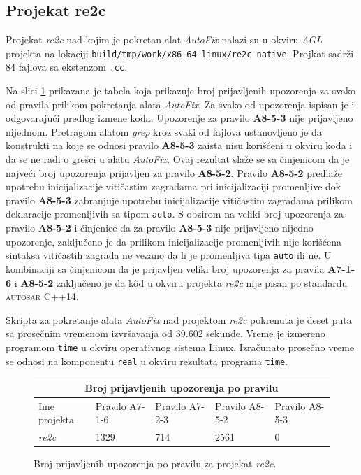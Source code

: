 \documentclass[12pt,oneside]{memoir}
\begin{document}
\subsection{Projekat re2c}

Projekat \textit{re2c} nad kojim je pokretan alat \textit{AutoFix} nalazi su u okviru \textit{AGL} projekta na lokaciji \texttt{build/tmp/work/x86\_64-linux/re2c-native}. Projkat sadr\v{z}i 84 fajlova sa ekstenzom \texttt{.cc}. \par
Na slici \ref{fig:re2c} prikazana je tabela koja prikazuje broj prijavljenih upozorenja za svako od pravila prilikom pokretanja alata \textit{AutoFix}.
Za svako od upozorenja ispisan je i odgovaraju\'{c}i predlog izmene koda. Upozorenje za pravilo \textbf{A8-5-3} nije prijavljeno nijednom. Pretragom
alatom \textit{grep} kroz svaki od fajlova ustanovljeno je da konstrukti na koje se odnosi pravilo \textbf{A8-5-3} zaista nisu kori\v{s}\'{c}eni u okviru koda i da se ne radi o gre\v{s}ci u alatu \textit{AutoFix}. Ovaj rezultat sla\v{z}e se sa \v{c}injenicom da je najve\'{c}i broj upozorenja prijavljen za pravilo \textbf{A8-5-2}. Pravilo \textbf{A8-5-2} predla\v{z}e upotrebu inicijalizacije viti\v{c}astim zagradama pri inicijalizaciji promenljive dok pravilo \textbf{A8-5-3} zabranjuje upotrebu inicijalizacije viti\v{c}astim zagradama prilikom deklaracije promenljivih sa tipom \texttt{auto}. S obzirom na veliki broj upozorenja za pravilo \textbf{A8-5-2} i \v{c}injenice da za pravilo \textbf{A8-5-3} nije prijavljeno nijedno upozorenje, zaklju\v{c}eno je da prilikom inicijalizacije promenljivih nije kori\v{s}\'{c}ena sintaksa viti\v{c}astih zagrada ne vezano da li je promenljiva
tipa \texttt{auto} ili ne. U kombinaciji sa \v{c}injenicom da je prijavljen veliki broj upozorenja za pravila \textbf{A7-1-6} i \textbf{A8-5-2} zaklju\v{c}eno je da k\^{o}d u okviru projekta \textit{re2c} nije pisan po standardu \textsc{autosar} C++14. \par
Skripta za pokretanje alata \textit{AutoFix} nad projektom \textit{re2c} pokrenuta je deset puta sa prose\v{c}nim vremenom izvr\v{s}avanja od 39.602 sekunde. Vreme je izmereno programom \texttt{time} u okviru operativnog sistema Linux. Izra\v{c}unato prose\v{c}no vreme se odnosi na komponentu \texttt{real} u okviru rezultata programa \texttt{time}.
\begin{figure}
\begin{center}
\begin{tabular}{ |p{3cm}||p{2cm}|p{2cm}|p{2cm}|p{2cm}|  }
 \hline
 \multicolumn{5}{|c|}{Broj prijavljenih upozorenja po pravilu} \\
 \hline
 Ime projekta & Pravilo A7-1-6 & Pravilo A7-2-3 & Pravilo A8-5-2 & Pravilo A8-5-3\\
 \hline
 \textit{re2c}   & 1329            & 714             & 2561            & 0\\
 \hline
\end{tabular}
\caption{Broj prijavljenih upozorenja po pravilu za projekat \textit{re2c}.}
\label{fig:re2c}
\end{center}
\end{figure}
\end{document}
